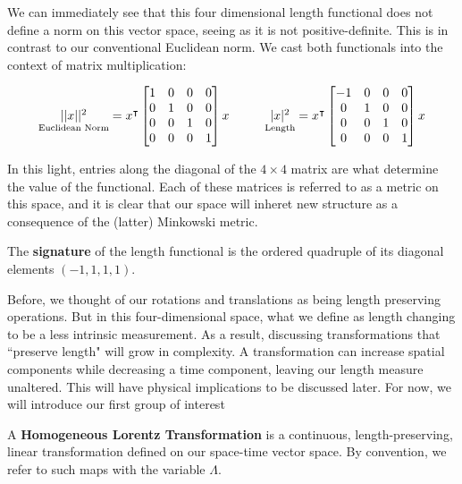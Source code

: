 We can immediately see that this four dimensional length functional does not define a norm on this vector space, seeing as it is not positive-definite. This is in contrast to our conventional Euclidean norm. We cast both functionals into the context of matrix multiplication:

$$\begin{array}{c@{\hskip 1cm}c}

	\underset{\text{Euclidean Norm}}{||x||^2} = x^\intercal\begin{bmatrix}
													1 & 0 & 0 & 0\\
													 0 & 1 & 0 & 0\\
													0 & 0 & 1 & 0\\
													0 & 0 & 0 & 1
												\end{bmatrix}x

&
	\underset{\text{Length}}{|x|^2} = x^\intercal\begin{bmatrix}
													-1 & 0 & 0 & 0\\
													 0 & 1 & 0 & 0\\
													0 & 0 & 1 & 0\\
													0 & 0 & 0 & 1
												\end{bmatrix}x

\end{array}$$

In this light, entries along the diagonal of the $4\times 4$ matrix are what determine the value of the functional. Each of these matrices is referred to as a metric on this space, and it is clear that our space will inheret new structure as a consequence of the (latter) Minkowski metric.

\begin{definition}
	The \textbf{signature} of the length functional is the ordered quadruple of its diagonal elements $(-1,1,1,1)$.
\end{definition}

Before, we thought of our rotations and translations as being length preserving operations. But in this four-dimensional space, what we define as length changing to be a less intrinsic measurement. As a result, discussing transformations that ``preserve length" will grow in complexity. A transformation can increase spatial components while decreasing a time component, leaving our length measure unaltered. This will have physical implications to be discussed later. For now, we will introduce our first group of interest

\begin{definition}
	A \textbf{Homogeneous Lorentz Transformation} is a continuous, length-preserving, linear transformation defined on our space-time vector space. By convention, we refer to such maps with the variable $\Lambda$.
\end{definition}

